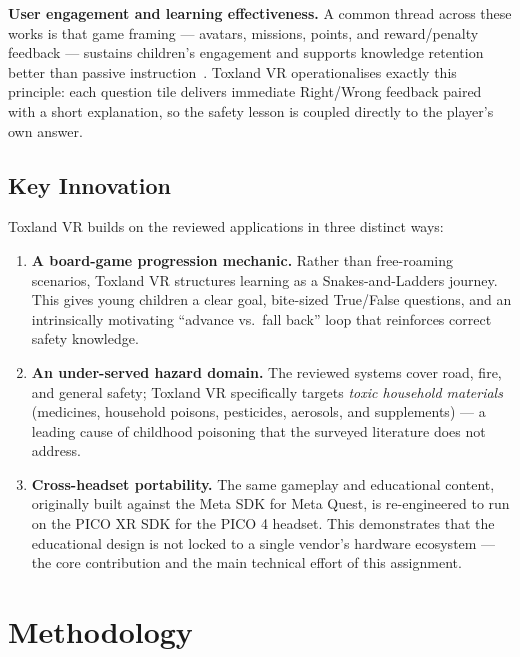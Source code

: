 \documentclass[a4paper,12pt]{article}
\begin{document}
\textbf{User engagement and learning effectiveness.} A common thread across these works is that game framing --- avatars, missions, points, and reward/penalty feedback --- sustains children's engagement and supports knowledge retention better than passive instruction~\cite{safecity2020,roadsafety2021}. Toxland VR operationalises exactly this principle: each question tile delivers immediate Right/Wrong feedback paired with a short explanation, so the safety lesson is coupled directly to the player's own answer.

\subsection{Key Innovation}

Toxland VR builds on the reviewed applications in three distinct ways:

\begin{enumerate}
  \item \textbf{A board-game progression mechanic.} Rather than free-roaming scenarios, Toxland VR structures learning as a Snakes-and-Ladders journey. This gives young children a clear goal, bite-sized True/False questions, and an intrinsically motivating ``advance vs.\ fall back'' loop that reinforces correct safety knowledge.
  \item \textbf{An under-served hazard domain.} The reviewed systems cover road, fire, and general safety; Toxland VR specifically targets \emph{toxic household materials} (medicines, household poisons, pesticides, aerosols, and supplements) --- a leading cause of childhood poisoning that the surveyed literature does not address.
  \item \textbf{Cross-headset portability.} The same gameplay and educational content, originally built against the Meta SDK for Meta Quest, is re-engineered to run on the PICO XR SDK for the PICO 4 headset. This demonstrates that the educational design is not locked to a single vendor's hardware ecosystem --- the core contribution and the main technical effort of this assignment.
\end{enumerate}

\section{Methodology}
\end{document}
